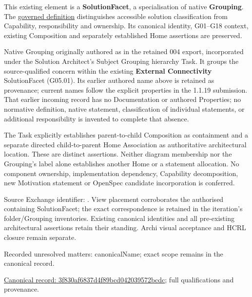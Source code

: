 This existing element is a \textbf{SolutionFacet}, a specialisation of native
\textbf{Grouping}. The \href{\detokenize{../../../../../../../governance/continuum-representation.md#solutionfacet-classification--1119-candidate}}{governed definition}
distinguishes accessible solution classification from Capability, responsibility
and ownership. Its canonical identity, G01–G18 context, existing Composition
and separately established Home assertions are preserved.



Native Grouping originally authored as \texttt{} in the retained 004 export,
incorporated under the Solution Architect's Subject Grouping hierarchy Task.
It groups the source-qualified \texttt{} concern within
the existing \textbf{External Connectivity} SolutionFacet (G05.01). Its earlier authored name above is retained as provenance; current names
follow the explicit properties in the 1.1.19 submission.
That earlier incoming record has no Documentation or authored Properties; no normative
definition, native statement, classification of individual statements, or
additional responsibility is invented to complete that absence.



The Task explicitly establishes parent-to-child Composition as containment and
a separate directed child-to-parent Home Association as authoritative architectural
location. These are distinct assertions. Neither diagram membership nor the
Grouping's label alone establishes another Home or a statement allocation.
No component ownership, implementation dependency, Capability decomposition,
new Motivation statement or OpenSpec candidate incorporation is conferred.



Source Exchange identifier: \texttt{}. View placement corroborates
the authorised containing SolutionFacet; the exact correspondence is retained in the
iteration's folder/Grouping inventories. Existing canonical identities and all
pre-existing architectural assertions retain their standing. Archi visual
acceptance and HCRL closure remain separate.


{\small Recorded unresolved matters: canonicalName; exact scope remains in the canonical record.}\par
{\footnotesize \href{../../../../../../../continuum/grouping/3f830af6837d4f89bcd042039572bcdc.md}{Canonical record: 3f830af6837d4f89bcd042039572bcdc}; full qualifications and provenance.}\par
